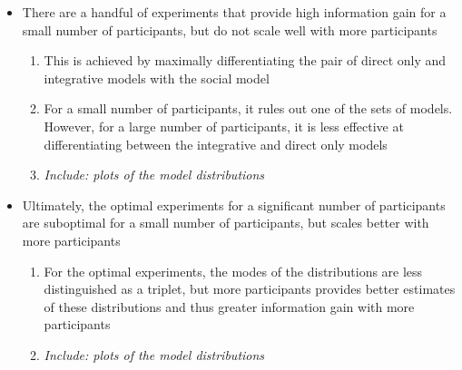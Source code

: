 \documentclass[11pt]{article}
\begin{document}
\begin{itemize}
\begin{itemize}
\begin{itemize}
                        \item There are a handful of experiments that provide high information gain for a small number of participants, but do not scale well with more participants
                            \begin{enumerate}
                                \item This is achieved by maximally differentiating the pair of direct only and integrative models with the social model
                                \item For a small number of participants, it rules out one of the sets of models. However, for a large number of participants, it is less effective at differentiating between the integrative and direct only models
                                \item \emph{Include: plots of the model distributions}
                            \end{enumerate}
                        \item Ultimately, the optimal experiments for a significant number of participants are suboptimal for a small number of participants, but scales better with more participants
                            \begin{enumerate}
                                \item For the optimal experiments, the modes of the distributions are less distinguished as a triplet, but more participants provides better estimates of these distributions and thus greater information gain with more participants
                                \item \emph{Include: plots of the model distributions}
                            \end{enumerate}
                    \end{itemize}


\end{itemize}
\end{itemize}
\end{document}
